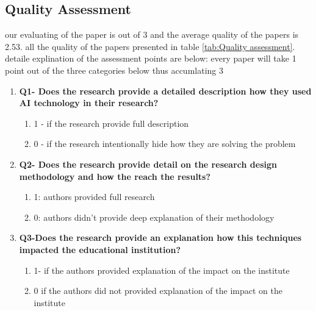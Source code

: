 \documentclass{svproc}
\begin{document}
\subsection{Quality Assessment}
\label{Quality_Assessment}
our evaluating of the paper is out of 3 and the average quality of the papers is 2.53. all the quality of the papers presented in table \ref{tab:Quality assessment}. detaile explination of the assessment points are below: every paper will take 1 point out of the three categories below thus accumlating 3 


\begin{enumerate}
    \item
    \textbf{Q1- Does the research provide a detailed description how they used AI technology in their research?}
\begin{enumerate}
\item 1 - if the research provide full description               
\item 0 - if the research intentionally hide how they are solving the problem           
\end{enumerate}


\item 
\textbf{Q2- Does the research provide detail on the research design methodology and how the reach the results?}\begin{enumerate}
\item  1: authors provided full research
\item  0: authors didn't provide deep explanation of their methodology 
\end{enumerate}

\item 
\textbf{Q3-Does the research provide an explanation how this techniques impacted the educational institution?}
\begin{enumerate}
\item  1- if the authors provided explanation of the impact on the institute                  
\item  0 if the authors did not provided explanation of the impact on the institute          
\end{enumerate}
\end{enumerate}
\end{document}
